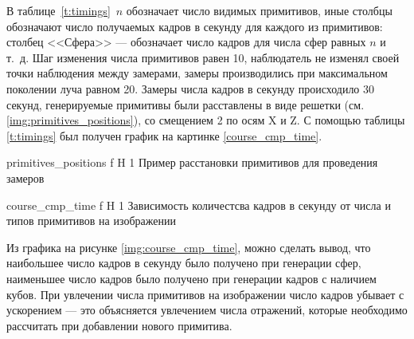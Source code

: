 В таблице~\ref{t:timings}~$n$ обозначает число видимых примитивов, иные столбцы обозначают число получаемых кадров в секунду для каждого из примитивов: столбец <<Сфера>> --- обозначает число кадров для числа сфер равных $n$ и т.~д. Шаг изменения числа примитивов равен 10, наблюдатель не изменял своей точки наблюдения между замерами, замеры производились при максимальном поколении луча равном 20.
Замеры числа кадров в секунду происходило 30 секунд,  генерируемые примитивы были расставлены в виде решетки (см. \ref{img:primitives_positions}), со смещением 2 по осям X и Z. С помощью таблицы \ref{t:timings} был получен график на картинке \ref{course_cmp_time}.


{primitives_positions} %
{f} %
{H} %
{1\textwidth} %
{Пример расстановки примитивов для проведения замеров} %



{course_cmp_time} %
{f} %
{H} %
{1\textwidth} %
{Зависимость количестсва кадров в секунду от числа и типов примитивов на изображении} %

Из графика на рисунке \ref{img:course_cmp_time}, можно сделать вывод, что
наибольшее число кадров в секунду было получено при генерации сфер, наименьшее число кадров было получено при генерации кадров с наличием кубов. При увлечении числа примитивов на изображении число кадров убывает с ускорением --- это объясняется увлечением числа отражений, которые необходимо рассчитать при добавлении нового примитива.




